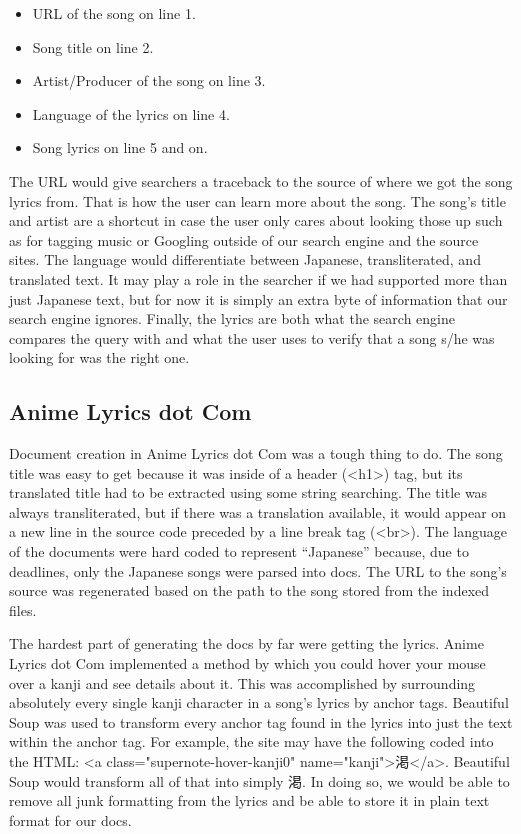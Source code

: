 \documentclass{acm} %
\begin{document}
\begin{CJK}{UTF8}{zhsong}
\begin{itemize}
\item URL of the song on line 1.
\item Song title on line 2.
\item Artist/Producer of the song on line 3.
\item Language of the lyrics on line 4.
\item Song lyrics on line 5 and on.
\end{itemize}

The URL would give searchers a traceback to the source of where we got the song lyrics from. That is how the user can learn more about the song. The song's title and artist are a shortcut in case the user only cares about looking those up such as for tagging music or Googling outside of our search engine and the source sites. The language would differentiate between Japanese, transliterated, and translated text. It may play a role in the searcher if we had supported more than just Japanese text, but for now it is simply an extra byte of information that our search engine ignores. Finally, the lyrics are both what the search engine compares the query with and what the user uses to verify that a song s/he was looking for was the right one.

\subsection{Anime Lyrics dot Com}

Document creation in Anime Lyrics dot Com was a tough thing to do. The song title was easy to get because it was inside of a header (<h1>) tag, but its translated title had to be extracted using some string searching. The title was always transliterated, but if there was a translation available, it would appear on a new line in the source code preceded by a line break tag (<br>). The language of the documents were hard coded to represent ``Japanese'' because, due to deadlines, only the Japanese songs were parsed into docs. The URL to the song's source was regenerated based on the path to the song stored from the indexed files.

The hardest part of generating the docs by far were getting the lyrics. Anime Lyrics dot Com implemented a method by which you could hover your mouse over a kanji and see details about it. This was accomplished by surrounding absolutely every single kanji character in a song's lyrics by anchor tags. Beautiful Soup was used to transform every anchor tag found in the lyrics into just the text within the anchor tag. For example, the site may have the following coded into the HTML: <a class="supernote-hover-kanji0" name="kanji">渇</a>. Beautiful Soup would transform all of that into simply 渇. In doing so, we would be able to remove all junk formatting from the lyrics and be able to store it in plain text format for our docs.


\end{CJK}
\end{document}
